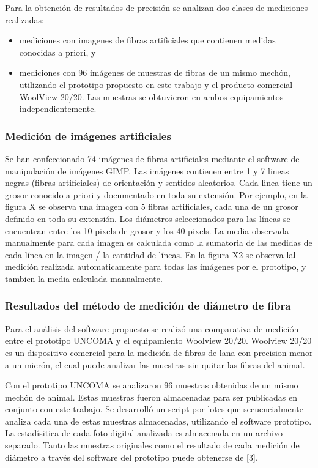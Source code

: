 \documentclass[runningheads,a4paper]{llncs}
\begin{document}
Para la obtención de resultados de precisión se analizan dos clases de mediciones realizadas: 
\begin{itemize}
\item mediciones con imagenes de fibras artificiales que contienen medidas conocidas a priori, y
\item mediciones con 96 imágenes de muestras de fibras de un mismo mechón, utilizando el prototipo propuesto en este trabajo y el producto comercial WoolView 20/20. Las muestras se obtuvieron en ambos equipamientos independientemente.
\end{itemize}

\subsubsection{Medición de imágenes artificiales}

Se han confeccionado 74 imágenes de fibras artificiales mediante el software de manipulación de imágenes GIMP. Las imágenes contienen entre 1 y 7 lineas negras (fibras artificiales) de orientación  y sentidos aleatorios. Cada linea tiene un grosor conocido a priori y documentado en toda su extensión. Por ejemplo, en la figura X se observa una imagen con 5 fibras artificiales, cada una de un grosor definido en toda su extensión. Los diámetros seleccionados para las líneas se encuentran entre los 10 pixels de grosor y los 40 pixels. La media observada manualmente para cada imagen es calculada como la sumatoria de las medidas de cada línea en la imagen / la cantidad de líneas.
En la figura X2 se observa lal medición realizada automaticamente para todas las imágenes por el prototipo, y tambien la media calculada manualmente. 

\subsubsection{Resultados del método de medición de diámetro de fibra} 

Para el análisis del software propuesto se realizó una comparativa de medición entre el prototipo UNCOMA y el equipamiento Woolview 20/20. 
Woolview 20/20 es un dispositivo comercial para la medición de fibras de lana con precision menor a un micrón, el cual puede analizar las muestras sin quitar las fibras del animal. 

Con el prototipo UNCOMA se analizaron 96 muestras obtenidas de un mismo mechón de animal. Estas muestras fueron almacenadas para ser publicadas en conjunto con este trabajo. Se desarrolló un script por lotes que secuencialmente analiza cada una de estas muestras almacenadas, utilizando el software prototipo. La estadísitica de cada foto digital analizada es almacenada en un archivo separado. Tanto las muestras originales como el resultado de cada medición de diámetro a través del software del prototipo puede obtenerse de [3].
\end{document}

